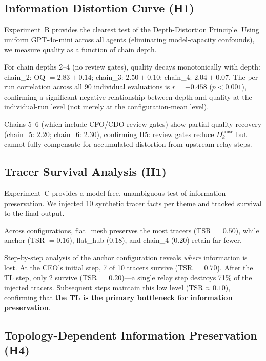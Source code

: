 \documentclass[conference]{IEEEtran}
\begin{document}
\subsection{Information Distortion Curve (H1)}
\label{subsec:h1_result}

Experiment~B provides the clearest test of the Depth-Distortion Principle.
Using uniform GPT-4o-mini across all agents (eliminating model-capacity confounds), we measure quality as a function of chain depth.

For chain depths 2--4 (no review gates), quality decays monotonically with depth: chain\_2: OQ $= 2.83 \pm 0.14$; chain\_3: $2.50 \pm 0.10$; chain\_4: $2.04 \pm 0.07$.
The per-run correlation across all 90 individual evaluations is $r = -0.458$ ($p < 0.001$), confirming a significant negative relationship between depth and quality at the individual-run level (not merely at the configuration-mean level).

Chains 5--6 (which include CFO/CDO review gates) show partial quality recovery (chain\_5: $2.20$; chain\_6: $2.30$), confirming H5: review gates reduce $D_k^{\text{noise}}$ but cannot fully compensate for accumulated distortion from upstream relay steps.

\subsection{Tracer Survival Analysis (H1)}
\label{subsec:tracer_result}

Experiment~C provides a model-free, unambiguous test of information preservation.
We injected 10 synthetic tracer facts per theme and tracked survival to the final output.

Across configurations, flat\_mesh preserves the most tracers (TSR $= 0.50$), while anchor (TSR $= 0.16$), flat\_hub ($0.18$), and chain\_4 ($0.20$) retain far fewer.

Step-by-step analysis of the anchor configuration reveals \emph{where} information is lost.
At the CEO's initial step, 7 of 10 tracers survive (TSR $= 0.70$).
After the TL step, only 2 survive (TSR $= 0.20$)---a single relay step destroys 71\% of the injected tracers.
Subsequent steps maintain this low level ($\text{TSR} \approx 0.10$), confirming that \textbf{the TL is the primary bottleneck for information preservation}.

\subsection{Topology-Dependent Information Preservation (H4)}
\label{subsec:h4_result}
\end{document}
